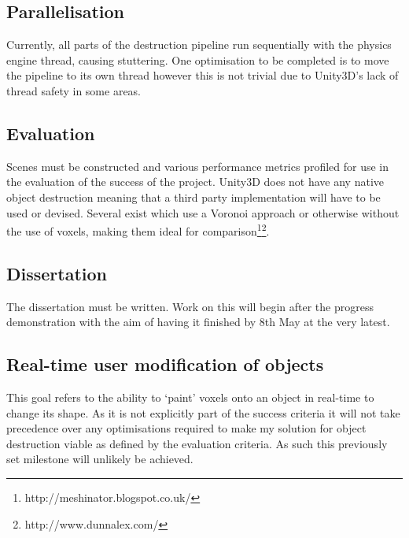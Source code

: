 \documentclass[a4 paper,12pt]{article}
\begin{document}
\subsection*{Parallelisation}

Currently, all parts of the destruction pipeline run sequentially with the physics engine thread, causing stuttering. One optimisation to be completed is to move the pipeline to its own thread however this is not trivial due to Unity3D's lack of thread safety in some areas. 

\subsection*{Evaluation}

Scenes must be constructed and various performance metrics profiled for use in the evaluation of the success of the project. Unity3D does not have any native object destruction meaning that a third party implementation will have to be used or devised. Several exist which use a Voronoi approach or otherwise without the use of voxels, making them ideal for comparison\footnote{http://meshinator.blogspot.co.uk/}\footnote{http://www.dunnalex.com/}.

\subsection*{Dissertation}

The dissertation must be written. Work on this will begin after the progress demonstration with the aim of having it finished by 8th May at the very latest.

\subsection*{Real-time user modification of objects}

This goal refers to the ability to `paint' voxels onto an object in real-time to change its shape. As it is not explicitly part of the success criteria it will not take precedence over any optimisations required to make my solution for object destruction viable as defined by the evaluation criteria. As such this previously set milestone will unlikely be achieved.
\end{document}
